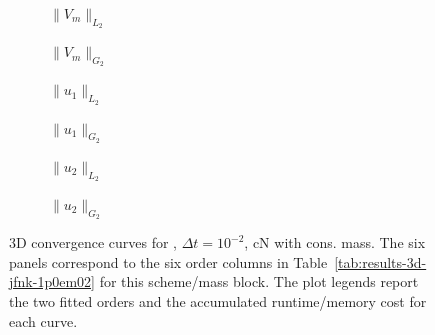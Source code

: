 \begin{figure}[p]
\centering
\begin{subfigure}{0.485\linewidth}
\centering
{}
\caption{$\|V_m\|_{L_2}$}
\label{fig:results-3d-jfnk-1p0em02-cranknicolson-consistent-a}
\end{subfigure}
\hfill
\begin{subfigure}{0.485\linewidth}
\centering
{}
\caption{$\|V_m\|_{G_2}$}
\label{fig:results-3d-jfnk-1p0em02-cranknicolson-consistent-b}
\end{subfigure}
\par\vspace{0.8em}
\begin{subfigure}{0.485\linewidth}
\centering
{}
\caption{$\|u_1\|_{L_2}$}
\label{fig:results-3d-jfnk-1p0em02-cranknicolson-consistent-c}
\end{subfigure}
\hfill
\begin{subfigure}{0.485\linewidth}
\centering
{}
\caption{$\|u_1\|_{G_2}$}
\label{fig:results-3d-jfnk-1p0em02-cranknicolson-consistent-d}
\end{subfigure}
\par\vspace{0.8em}
\begin{subfigure}{0.485\linewidth}
\centering
{}
\caption{$\|u_2\|_{L_2}$}
\label{fig:results-3d-jfnk-1p0em02-cranknicolson-consistent-e}
\end{subfigure}
\hfill
\begin{subfigure}{0.485\linewidth}
\centering
{}
\caption{$\|u_2\|_{G_2}$}
\label{fig:results-3d-jfnk-1p0em02-cranknicolson-consistent-f}
\end{subfigure}
\caption{3D convergence curves for , $\Delta t=10^{-2}$, cN with cons. mass. The six panels correspond to the six order columns in Table~\ref{tab:results-3d-jfnk-1p0em02} for this scheme/mass block. The plot legends report the two fitted orders and the accumulated runtime/memory cost for each curve.}
\label{fig:results-3d-jfnk-1p0em02-cranknicolson-consistent}
\end{figure}
\FloatBarrier

